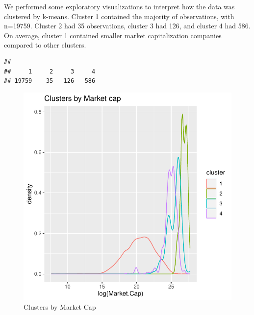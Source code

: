 \documentclass[11pt,]{article}
\begin{document}
We performed some exploratory visualizations to interpret how the data
was clustered by k-means. Cluster 1 contained the majority of
observations, with n=19759. Cluster 2 had 35 observations, cluster 3 had
126, and cluster 4 had 586. On average, cluster 1 contained smaller
market capitalization companies compared to other clusters.

\begin{verbatim}
## 
##     1     2     3     4 
## 19759    35   126   586
\end{verbatim}

\begin{figure}

{\centering \includegraphics{stock_analysis_files/figure-latex/cluster by marketcap-1} 

}

\caption{Clusters by Market Cap}\label{fig:cluster by marketcap}
\end{figure}
\end{document}
